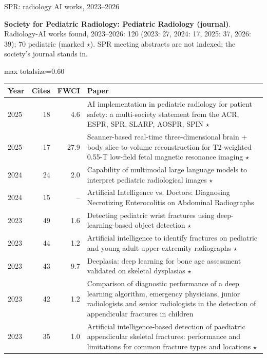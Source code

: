 \documentclass[aspectratio=169]{beamer}
\renewcommand{\arraystretch}{1.08}
\begin{document}
\begin{frame}[category=Conferences]{SPR: radiology AI works, 2023--2026}
{\scriptsize \textbf{Society for Pediatric Radiology: Pediatric Radiology (journal)}. Radiology-AI works found, 2023--2026: 120 (2023: 27, 2024: 17, 2025: 37, 2026: 39); 70 pediatric (marked $\star$). SPR meeting abstracts are not indexed; the society's journal stands in.\par}\vspace{2pt}
\tiny
\begin{adjustbox}{max totalsize={\textwidth}{0.60\textheight}}
\renewcommand{\arraystretch}{1.2}
\begin{tabular}{|l|r|r|>{\raggedright\arraybackslash}p{}|}
\hline \textbf{Year} & \textbf{Cites} & \textbf{FWCI} & \textbf{Paper} \\ \hline
2025 & 18 & 4.6 & AI implementation in pediatric radiology for patient safety: a multi-society statement from the ACR, ESPR, SPR, SLARP, AOSPR, SPIN $\star$ \\ \hline
2025 & 17 & 27.9 & Scanner-based real-time three-dimensional brain + body slice-to-volume reconstruction for T2-weighted 0.55-T low-field fetal magnetic resonance imaging $\star$ \\ \hline
2024 & 24 & 2.0 & Capability of multimodal large language models to interpret pediatric radiological images $\star$ \\ \hline
2024 & 15 & -- & Artificial Intelligence vs. Doctors: Diagnosing Necrotizing Enterocolitis on Abdominal Radiographs \\ \hline
2023 & 49 & 1.6 & Detecting pediatric wrist fractures using deep-learning-based object detection $\star$ \\ \hline
2023 & 44 & 1.2 & Artificial intelligence to identify fractures on pediatric and young adult upper extremity radiographs $\star$ \\ \hline
2023 & 43 & 9.7 & Deeplasia: deep learning for bone age assessment validated on skeletal dysplasias $\star$ \\ \hline
2023 & 42 & 1.2 & Comparison of diagnostic performance of a deep learning algorithm, emergency physicians, junior radiologists and senior radiologists in the detection of appendicular fractures in children \\ \hline
2023 & 35 & 1.0 & Artificial intelligence-based detection of paediatric appendicular skeletal fractures: performance and limitations for common fracture types and locations $\star$ \\ \hline

\end{tabular}
\end{adjustbox}
\end{frame}
\end{document}
